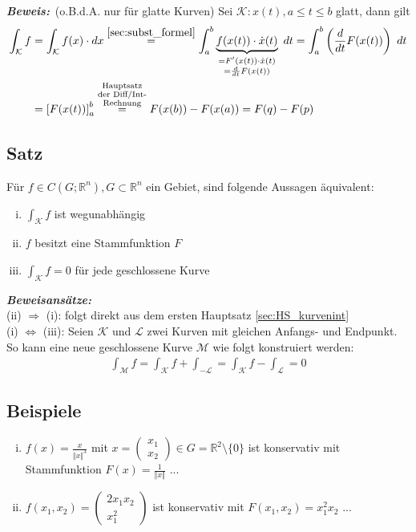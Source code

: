 \documentclass[11pt,a4paper]{book}
\newcommand {\Rn}	{\mathbb{R}^n}
\newcommand {\Rzwei}	{\mathbb{R}^2}
\newcommand{\1}    	{\mathbbm{1}}
\newcommand{\Kurve}	{{\mathcal{K}}}
\newcommand{\Beweis}[1][Beweis]
{\begin{mdframed}[backgroundcolor=gray!10,linewidth=0pt]\noindent\textit{\textbf{{#1}:}}~}
\newcommand{\QED}	{\end{mdframed}}
\begin{document}
\Beweis (o.B.d.A. nur für glatte Kurven) Sei \(\Kurve : x(t), a \leqslant t \leqslant b\) glatt, dann gilt
\begin{align*}
	\int_\Kurve f &= \int_\Kurve f(x) \cdot dx \stackrel{\ref{sec:subst_formel}}{=}
	\int_a^b \underbrace{f(x(t))\cdot\dot{x}(t)}
	_{\substack{
		= F'(x(t))\cdot\dot{x}(t) \\
		= \frac{d}{dt} F(x(t))
	}} ~dt =
	\int_a^b \left( \frac{d}{dt} F(x(t)) \right)~dt \\
	&= \left[ F(x(t)) \right]_a^b \stackrel{\substack{\textrm{Hauptsatz}\\\textrm{der Diff/Int-}\\\textrm{Rechnung}}}{=} F(x(b)) - F(x(a)) = F(q) - F(p)
\end{align*}
\QED

\subsection{Satz}
Für \(f \in C(G;\Rn), G \subset \Rn\) ein Gebiet, sind folgende Aussagen äquivalent:
\begin{enumerate}[(i)]
	\item \(\int_\Kurve f\) ist wegunabhängig
	\item \(f\) besitzt eine Stammfunktion \(F\)
	\item \(\int_\Kurve f = 0\) für jede geschlossene Kurve
\end{enumerate}
\Beweis[Beweisansätze]\\
(ii) \(\Rightarrow\) (i): folgt direkt aus dem ersten Hauptsatz \ref{sec:HS_kurvenint}\\
(i) \(\Leftrightarrow\) (iii): Seien \(\Kurve\) und \(\mathcal{L}\) zwei Kurven mit gleichen Anfangs- und Endpunkt. So kann eine neue geschlossene Kurve \(\mathcal{M}\) wie folgt konstruiert werden:
\begin{align*}
	\int_\mathcal{M} f = \int_\Kurve f + \int_{-\mathcal{L}} = \int_\Kurve f - \int_{\mathcal{L}} = 0
\end{align*}
\QED

\subsection{Beispiele}
\begin{enumerate}[(i)]
	\item \(f(x) = \frac{x}{\Vert x \Vert^3}\) mit \(x = \left(\begin{array}{c} x_1 \\ x_2 \end{array}\right) \in G = \Rzwei \setminus \{0\}\) ist konservativ mit Stammfunktion \(F(x) = \frac{1}{\Vert x \Vert}\) ...
	\item \(f(x_1, x_2) = \left( \begin{array}{c} 2x_1x_2 \\ x_1^2 \end{array}\right)\) ist konservativ mit \(F(x_1,x_2) = x_1^2x_2\) ...
\end{enumerate}
\end{document}
